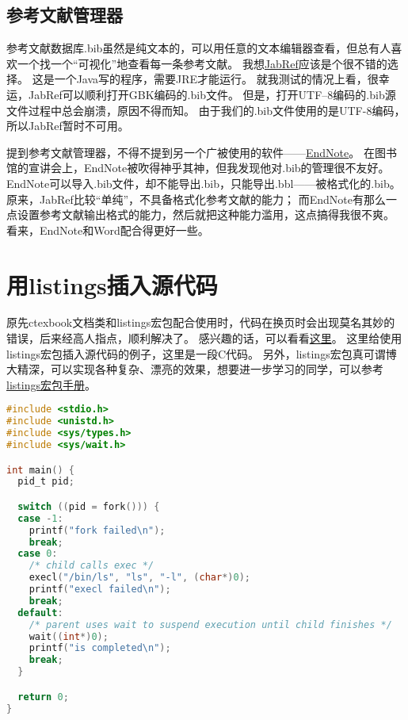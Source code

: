 \subsection{参考文献管理器}

参考文献数据库.bib虽然是纯文本的，可以用任意的文本编辑器查看，但总有人喜欢一个找一个``可视化''地查看每一条参考文献。
我想\href{http://jabref.sourceforge.net/}{JabRef}应该是个很不错的选择。
这是一个Java写的程序，需要JRE才能运行。
就我测试的情况上看，很幸运，JabRef可以顺利打开GBK编码的.bib文件。
但是，打开UTF--8编码的.bib源文件过程中总会崩溃，原因不得而知。
由于我们的.bib文件使用的是UTF-8编码，所以JabRef暂时不可用。

提到参考文献管理器，不得不提到另一个广被使用的软件——\href{http://www.endnote.com/}{EndNote}。
在图书馆的宣讲会上，EndNote被吹得神乎其神，但我发现他对.bib的管理很不友好。
EndNote可以导入.bib文件，却不能导出.bib，只能导出.bbl——被格式化的.bib。
原来，JabRef比较``单纯''，不具备格式化参考文献的能力；
而EndNote有那么一点设置参考文献输出格式的能力，然后就把这种能力滥用，这点搞得我很不爽。
看来，EndNote和Word配合得更好一些。


\section{用listings插入源代码}

原先ctexbook文档类和listings宏包配合使用时，代码在换页时会出现莫名其妙的错误，后来经高人指点，顺利解决了。
感兴趣的话，可以看看\href{http://bbs.ctex.org/viewthread.php?tid=53451}{这里}。
这里给使用listings宏包插入源代码的例子，这里是一段C代码。
另外，listings宏包真可谓博大精深，可以实现各种复杂、漂亮的效果，想要进一步学习的同学，可以参考
\href{http://mirror.ctan.org/macros/latex/contrib/listings/listings.pdf}{listings宏包手册}。

\begin{lstlisting}[language={C}, caption={一段C源代码}]
#include <stdio.h>
#include <unistd.h>
#include <sys/types.h>
#include <sys/wait.h>

int main() {
  pid_t pid;

  switch ((pid = fork())) {
  case -1:
    printf("fork failed\n");
    break;
  case 0:
    /* child calls exec */
    execl("/bin/ls", "ls", "-l", (char*)0);
    printf("execl failed\n");
    break;
  default:
    /* parent uses wait to suspend execution until child finishes */
    wait((int*)0);
    printf("is completed\n");
    break;
  }

  return 0;
}
\end{lstlisting}


